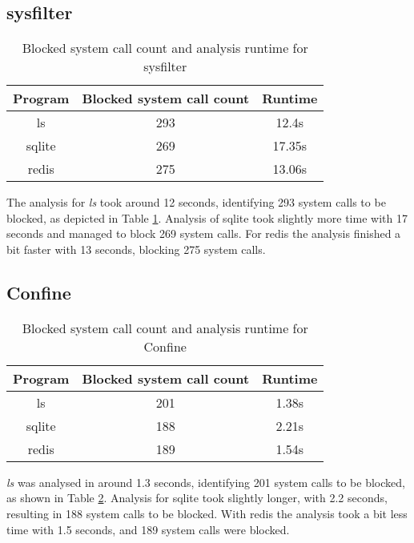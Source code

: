 \subsection {sysfilter}
\begin{table}[!h]
\begin{center}
\caption{Blocked system call count and analysis runtime for sysfilter}
\label{tbl:sysfilter_results}
\begin{tabular}{||c c c||} 
 \hline
 Program & Blocked system call count & Runtime \\
 \hline\hline
 ls & 293 & 12.4s \\ 
 \hline
 sqlite & 269 & 17.35s \\ 
 \hline
 redis & 275 & 13.06s \\ 
 \hline
\end{tabular}
\end{center}
\end{table}
The analysis for \textit{ls} took around 12 seconds, identifying 293 system calls to be blocked, as depicted in Table \ref{tbl:sysfilter_results}.
Analysis of sqlite took slightly more time with 17 seconds and managed to block 269 system calls.
For redis the analysis finished a bit faster with 13 seconds, blocking 275 system calls.

\subsection {Confine}
\begin{table}[!h]
\begin{center}
\caption{Blocked system call count and analysis runtime for Confine}
\label{tbl:confine_results}
\begin{tabular}{||c c c||} 
 \hline
 Program & Blocked system call count & Runtime \\
 \hline\hline
 ls & 201 & 1.38s \\ 
 \hline
 sqlite & 188 & 2.21s \\ 
 \hline
 redis & 189 & 1.54s \\ 
 \hline
\end{tabular}
\end{center}
\end{table}
\textit{ls} was analysed in around 1.3 seconds, identifying 201 system calls to be blocked, as shown in Table \ref{tbl:confine_results}.
Analysis for sqlite took slightly longer, with 2.2 seconds, resulting in 188 system calls to be blocked.
With redis the analysis took a bit less time with 1.5 seconds, and 189 system calls were blocked.

